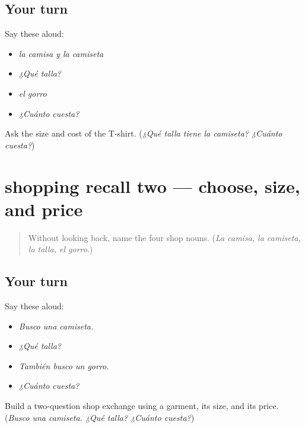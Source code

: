 \subsection*{Your turn}
Say these aloud:

\begin{itemize}
\raggedright
  \item \emph{la camisa y la camiseta}
  \item \emph{¿Qué talla?}
  \item \emph{el gorro}
  \item \emph{¿Cuánto cuesta?}
\end{itemize}

\begin{tcolorbox}[breakable,colback=teal!4,colframe=teal!35!black,title={Before you move on}]
Ask the size and cost of the T-shirt. (\emph{¿Qué talla tiene la camiseta? ¿Cuánto cuesta?})
\end{tcolorbox}
\section[(review)]{shopping recall two — choose, size, and price}

\label{lesson:ES-C402-shopping-recall-2}



\begin{quote}
Without looking back, name the four shop nouns. (\emph{La camisa, la camiseta, la talla, el gorro}.)
\end{quote}

\subsection*{Your turn}
Say these aloud:

\begin{itemize}
\raggedright
  \item \emph{Busco una camiseta.}
  \item \emph{¿Qué talla?}
  \item \emph{También busco un gorro.}
  \item \emph{¿Cuánto cuesta?}
\end{itemize}

\begin{tcolorbox}[breakable,colback=teal!4,colframe=teal!35!black,title={Before you move on}]
Build a two-question shop exchange using a garment, its size, and its price. (\emph{Busco una camiseta. ¿Qué talla? ¿Cuánto cuesta?})
\end{tcolorbox}
